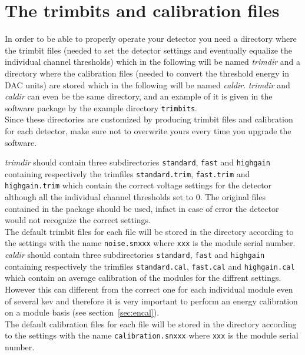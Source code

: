 \documentclass{report}
\begin{document}
\section{The trimbits and calibration files} \label{sec:trimdir}
In order to be able to properly operate your detector you need a directory where the trimbit files (needed to set the detector settings and eventually equalize the individual channel thresholds) which in the following will be named \textit{trimdir} and a directory where the calibration files (needed to convert the threshold energy in DAC units) are stored which in the following will be named \textit{caldir}. 
\textit{trimdir} and \textit{caldir} can even be the same directory, and an example of it is given in the software package by the example directory \verb=trimbits=. \\
Since these directories are customized by producing trimbit files and calibration for each detector, make sure not to overwrite yours every time you upgrade the software.

\textit{trimdir} should contain three subdirectories \verb=standard=,  \verb=fast= and  \verb=highgain= containing respectively the trimfiles \verb=standard.trim=,  \verb=fast.trim= and  \verb=highgain.trim= which contain the correct voltage settings for the detector although all the individual channel thresholds set to 0. The original files contained in the package should be used, infact in case of error the detector would not recognize the correct settings.\\
The default trimbit files for each file will be stored in the directory according to the settings with the name \verb=noise.snxxx= where \verb=xxx= is the module serial number.\\

\textit{caldir} should contain three subdirectories \verb=standard=,  \verb=fast= and  \verb=highgain= containing respectively the trimfiles \verb=standard.cal=,  \verb=fast.cal= and  \verb=highgain.cal= which contain an average calibration of the modules for the diffrent settings. However this can different from the correct one for each individual module even of several kev and therefore it is very important to perform an energy calibration on a module basis (see section~\ref{sec:encal}).\\
The default calibration files for each file will be stored in the directory according to the settings with the name \verb=calibration.snxxx= where \verb=xxx= is the module serial number.
\end{document}
